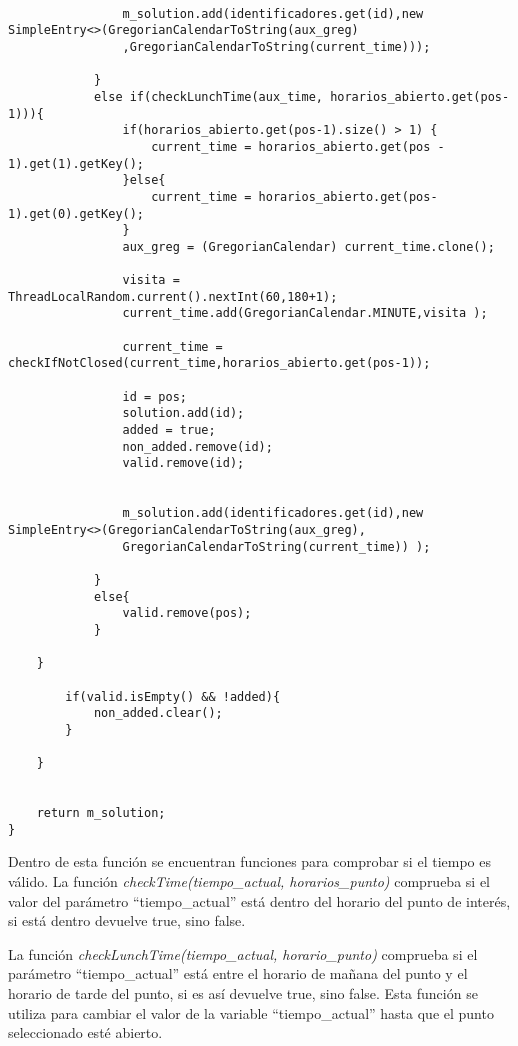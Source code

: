 \begin{lstlisting}[caption=Función para encontrar la ruta entre los puntos seleccionados]
				
				m_solution.add(identificadores.get(id),new SimpleEntry<>(GregorianCalendarToString(aux_greg)
				,GregorianCalendarToString(current_time)));
						
			} 
			else if(checkLunchTime(aux_time, horarios_abierto.get(pos-1))){
				if(horarios_abierto.get(pos-1).size() > 1) {
					current_time = horarios_abierto.get(pos - 1).get(1).getKey();
				}else{ 
					current_time = horarios_abierto.get(pos-1).get(0).getKey();
				}
				aux_greg = (GregorianCalendar) current_time.clone();
				
				visita = ThreadLocalRandom.current().nextInt(60,180+1);
				current_time.add(GregorianCalendar.MINUTE,visita );
				
				current_time = checkIfNotClosed(current_time,horarios_abierto.get(pos-1));
				
				id = pos;
				solution.add(id);
				added = true;
				non_added.remove(id);
				valid.remove(id);
				
				
				m_solution.add(identificadores.get(id),new SimpleEntry<>(GregorianCalendarToString(aux_greg),
				GregorianCalendarToString(current_time)) );
			
			}
			else{
				valid.remove(pos);
			}
		
	}
	
		if(valid.isEmpty() && !added){
			non_added.clear();
		}
	
	}
	
	
	return m_solution;
}
\end{lstlisting}

Dentro de esta función se encuentran funciones para comprobar si el tiempo es válido. La función \textit{checkTime(tiempo\_actual, horarios\_punto)} comprueba si el valor del parámetro \enquote{tiempo\_actual} está dentro del horario del punto de interés, si está dentro devuelve true, sino false.\newline

La función \textit{checkLunchTime(tiempo\_actual, horario\_punto)} comprueba si el parámetro \enquote{tiempo\_actual} está entre el horario de mañana del punto y el horario de tarde del punto, si es así devuelve true, sino false. Esta función se utiliza para cambiar el valor de la variable \enquote{tiempo\_actual} hasta que el punto seleccionado esté abierto.

